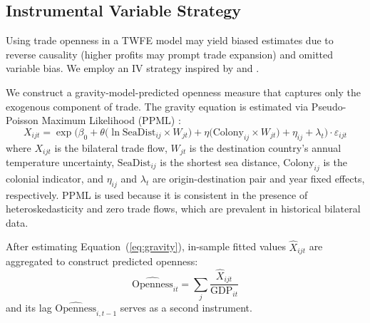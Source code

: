 \documentclass[10pt]{article}
\begin{document}
\subsection{Instrumental Variable Strategy}
\label{sec:iv_strategy}

Using trade openness in a TWFE model may yield biased estimates due to reverse causality (higher profits may prompt trade expansion) and omitted variable bias. We employ an IV strategy inspired by \citet{felbermayr2013natural} and \citet{frankel2017does}.

\par We construct a gravity-model-predicted openness measure that captures only the exogenous component of trade. The gravity equation is estimated via Pseudo-Poisson Maximum Likelihood (PPML) \citep{silva2006log}:
\begin{equation}
X_{ijt} = \exp\!\Big(\beta_0 + \theta\bigl(\ln\text{SeaDist}_{ij} \times W_{jt}\bigr) + \eta\bigl(\text{Colony}_{ij} \times W_{jt}\bigr) + \eta_{ij} + \lambda_t\Big) \cdot \varepsilon_{ijt}
\label{eq:gravity}
\end{equation}
where $X_{ijt}$ is the bilateral trade flow, $W_{jt}$ is the destination country's annual temperature uncertainty, $\text{SeaDist}_{ij}$ is the shortest sea distance, $\text{Colony}_{ij}$ is the colonial indicator, and $\eta_{ij}$ and $\lambda_t$ are origin-destination pair and year fixed effects, respectively. PPML is used because it is consistent in the presence of heteroskedasticity and zero trade flows, which are prevalent in historical bilateral data.

\par After estimating Equation~(\ref{eq:gravity}), in-sample fitted values $\hat{X}_{ijt}$ are aggregated to construct predicted openness:
\begin{equation}
\widehat{\text{Openness}}_{it} = \sum_j \frac{\hat{X}_{ijt}}{\text{GDP}_{it}}
\label{eq:pred_openness}
\end{equation}
and its lag $\widehat{\text{Openness}}_{i,t-1}$ serves as a second instrument.
\end{document}
